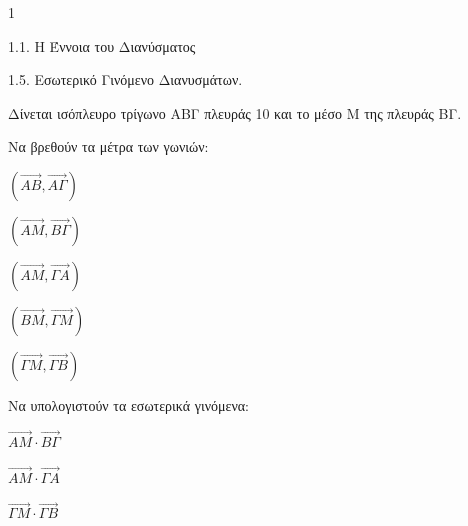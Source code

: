 \begin{ylh}{1}
    \item 1.1. Η Έννοια του Διανύσματος
    \item 1.5. Εσωτερικό Γινόμενο Διανυσμάτων.
\end{ylh}
\begin{figure}
    \centering
\end{figure}
Δίνεται ισόπλευρο τρίγωνο ΑΒΓ πλευράς 10 και το μέσο M της πλευράς ΒΓ.
\begin{alist}
\item Να βρεθούν τα μέτρα των γωνιών:
    \begin{rlist}
    \item $(\overrightarrow{AB}, \overrightarrow{A\Gamma})$
    \item $(\overrightarrow{AM}, \overrightarrow{B\Gamma})$
    \item $(\overrightarrow{AM}, \overrightarrow{\Gamma A})$
    \item $(\overrightarrow{BM}, \overrightarrow{\Gamma M})$
    \item $(\overrightarrow{\Gamma M}, \overrightarrow{\Gamma B})$
    \end{rlist} 
\item Να υπολογιστούν τα εσωτερικά γινόμενα:
    \begin{rlist}
    \item $\overrightarrow{AM} \cdot \overrightarrow{B\Gamma}$
    \item $\overrightarrow{AM} \cdot \overrightarrow{\Gamma A}$
    \item $\overrightarrow{\Gamma M} \cdot \overrightarrow{\Gamma B}$
    \end{rlist} 
\end{alist}